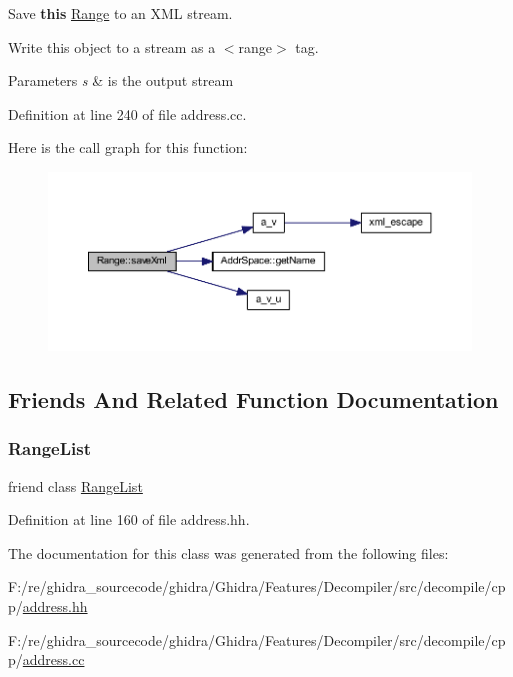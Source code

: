 Save {\bfseries{this}} \mbox{\hyperlink{class_range}{Range}} to an X\+ML stream. 

Write this object to a stream as a $<$range$>$ tag. 
\begin{DoxyParams}{Parameters}
{\em s} & is the output stream \\
\hline
\end{DoxyParams}


Definition at line 240 of file address.\+cc.

Here is the call graph for this function\+:
\nopagebreak
\begin{figure}[H]
\begin{center}
\leavevmode
\includegraphics[width=350pt]{class_range_a81bddd68f2b25699cba18e279d67e75c_cgraph}
\end{center}
\end{figure}


\subsection{Friends And Related Function Documentation}
\mbox{\label{class_range_aefb7602862bfe0af2bf90410672c7c0d}} 
\subsubsection{\texorpdfstring{RangeList}{RangeList}}
{\footnotesize\ttfamily friend class \mbox{\hyperlink{class_range_list}{Range\+List}}\hspace{0.3cm}{\ttfamily [friend]}}



Definition at line 160 of file address.\+hh.



The documentation for this class was generated from the following files\+:\begin{DoxyCompactItemize}
\item 
F\+:/re/ghidra\+\_\+sourcecode/ghidra/\+Ghidra/\+Features/\+Decompiler/src/decompile/cpp/\mbox{\hyperlink{address_8hh}{address.\+hh}}\item 
F\+:/re/ghidra\+\_\+sourcecode/ghidra/\+Ghidra/\+Features/\+Decompiler/src/decompile/cpp/\mbox{\hyperlink{address_8cc}{address.\+cc}}\end{DoxyCompactItemize}
